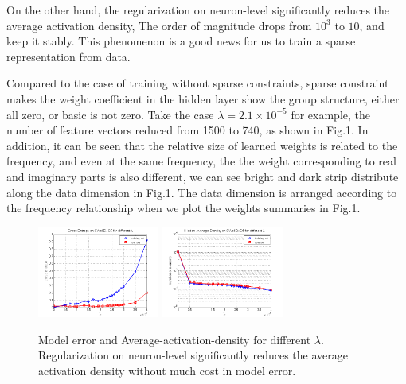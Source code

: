 On the other hand, the regularization on neuron-level significantly reduces the average activation density,
The order of magnitude drops from $10^{3}$ to $10$, and keep it stably. This phenomenon is a good news for
us to train a sparse representation from data.

Compared to the case of training without sparse constraints, sparse constraint makes the weight coefficient in the hidden layer show the group structure, either all zero, or basic is not zero. Take the case $\lambda=2.1 \times 10^{-5} $
for example, the number of feature vectors reduced from 1500 to 740, as shown in Fig.1. In addition, it can be seen that the relative size of learned weights is related to the frequency, and even at the same frequency, the the weight corresponding
to real and imaginary parts is also different, we can see bright and dark strip distribute along the data dimension in Fig.1. The data dimension is arranged according to the frequency relationship when we plot the weights summaries in Fig.1.

\begin{figure}
\includegraphics[width=4cm,height=3cm]{figure/Cross_Entropy_on_SWellEx_S5_for_different_lambda}
\includegraphics[width=4cm,height=3cm]{figure/Hidden_Average_Density_on_SWellEx_S5_for_different_lambda}
\caption{Model error and Average-activation-density for different $\lambda $.  Regularization on neuron-level
significantly reduces the average activation density without much cost in model error.}
\end{figure}



